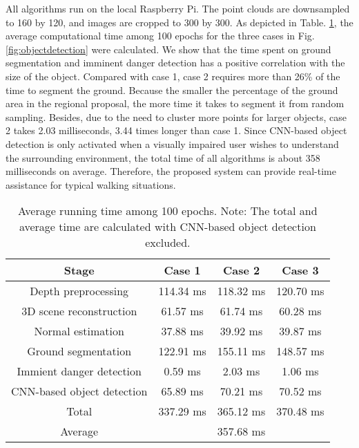 \documentclass{ieeeaccess}
\begin{document}
All algorithms run on the local Raspberry Pi. The point clouds are downsampled to 160 by 120, and images are cropped to 300 by 300. As depicted in Table. \ref{tab:computation cost}, the average computational time among 100 epochs for the three cases in Fig. \ref{fig:objectdetection} were calculated. We show that the time spent on ground segmentation and imminent danger detection has a positive correlation with the size of the object. Compared with case 1, case 2 requires more than 26\% of the time to segment the ground. Because the smaller the percentage of the ground area in the regional proposal, the more time it takes to segment it from random sampling. Besides, due to the need to cluster more points for larger objects, case 2 takes 2.03 milliseconds, 3.44 times longer than case 1. Since CNN-based object detection is only activated when a visually impaired user wishes to understand the surrounding environment, the total time of all algorithms is about 358 milliseconds on average. Therefore, the proposed system can provide real-time assistance for typical walking situations.

\begin{table}[]
\centering
\caption{Average running time among 100 epochs. Note: The total and average time are calculated with CNN-based object detection excluded.}
\label{tab:computation cost}
\begin{tabular}{|c|c|c|c|}
\hline
Stage                      & Case 1  & Case 2 & Case 3 \\ \hline
Depth preprocessing        &    114.34 ms  &  118.32 ms & 120.70 ms\\ \hline
3D scene reconstruction    &   61.57 ms   & 61.74 ms & 60.28 ms\\ \hline
Normal estimation          &    37.88 ms& 39.92 ms &  39.87 ms \\ \hline
Ground segmentation            &   122.91 ms  & 155.11 ms & 148.57 ms \\ \hline
Immient danger detection &     0.59 ms&  2.03 ms &  1.06 ms \\ \hline
CNN-based object detection       &   65.89 ms  &  70.21 ms & 70.52 ms\\ \hline
Total & 337.29 ms& 365.12 ms & 370.48 ms\\ \hline
Average &\multicolumn{3}{c|}{357.68 ms}  \\ \hline
\end{tabular}
\end{table}
\end{document}
